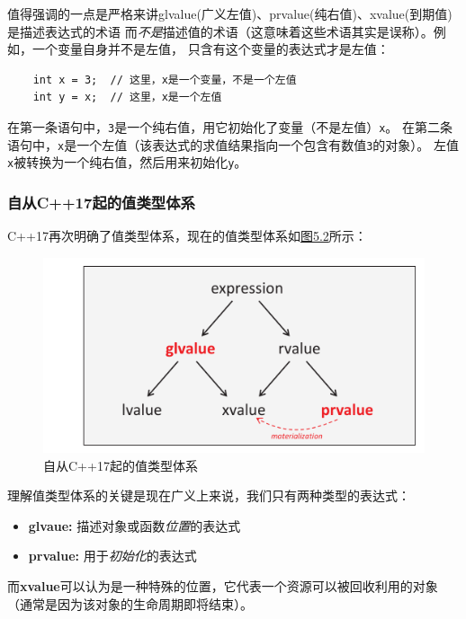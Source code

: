 值得强调的一点是严格来讲glvalue(广义左值)、prvalue(纯右值)、xvalue(到期值)是描述表达式的术语
而\emph{不是}描述值的术语（这意味着这些术语其实是误称）。例如，一个变量自身并不是左值，
只含有这个变量的表达式才是左值：
\begin{lstlisting}
    int x = 3;  // 这里，x是一个变量，不是一个左值
    int y = x;  // 这里，x是一个左值
\end{lstlisting}
在第一条语句中，\texttt{3}是一个纯右值，用它初始化了变量（不是左值）\texttt{x}。
在第二条语句中，\texttt{x}是一个左值（该表达式的求值结果指向一个包含有数值\texttt{3}的对象）。
左值\texttt{x}被转换为一个纯右值，然后用来初始化\texttt{y}。

\subsubsection{自从C++17起的值类型体系}
C++17再次明确了值类型体系，现在的值类型体系如\hyperref[f5.2]{图5.2}所示：

\begin{figure}[ht]
    \begin{center}
        \includegraphics[scale=0.8]{../imgs/05.2.png}
        \caption{自从C++17起的值类型体系}
        \label{f5.2}
    \end{center}
\end{figure}

理解值类型体系的关键是现在广义上来说，我们只有两种类型的表达式：
\begin{itemize}[leftmargin=*]
    \item \textbf{glvaue:} 描述对象或函数\emph{位置}的表达式
    \item \textbf{prvalue:} 用于\emph{初始化}的表达式
\end{itemize}
而\textbf{xvalue}可以认为是一种特殊的位置，它代表一个资源可以被回收利用的对象
（通常是因为该对象的生命周期即将结束）。

